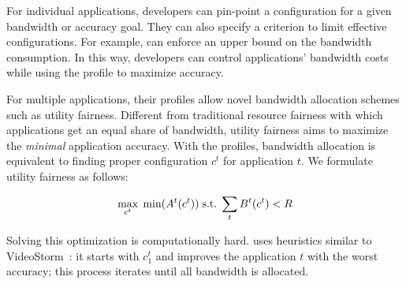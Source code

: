 For individual applications, developers can pin-point a configuration for a
given bandwidth or accuracy goal. They can also specify a criterion to limit
effective configurations. For example, \sysname{} can enforce an upper bound on
the bandwidth consumption. In this way, developers can control applications'
bandwidth costs while using the profile to maximize accuracy.

For multiple applications, their profiles allow novel bandwidth allocation
schemes such as utility fairness. Different from traditional resource fairness
with which applications get an equal share of bandwidth, utility fairness aims
to maximize the \textit{minimal} application accuracy. With the profiles,
bandwidth allocation is equivalent to finding proper configuration $c^t$ for
application $t$. We formulate utility fairness as follows:


\vspace{-0.5em}
\begin{equation}
  \vspace{-0.5em}
  \label{eq:multitask}
 \underset{c^t}{\max} \; \min({A^t(c^t)})
 \;
 \text{s.t.}
 \;
 \sum_t{B^t(c^t)} < R
\end{equation}


Solving this optimization is computationally hard. \sysname{} uses heuristics
similar to VideoStorm~\cite{zhang2017live}: it starts with $c^t_1$ and improves
the application $t$ with the worst accuracy; this process iterates until all
bandwidth is allocated.


